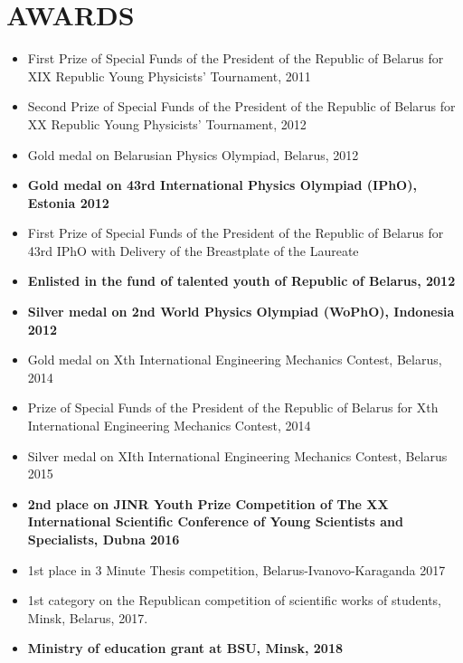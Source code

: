 \documentclass[paper=a4,fontsize=11pt]{scrartcl} %
\newcommand{\NewPart}[1]{\section*{\uppercase{#1}}}
\begin{document}
\NewPart{Awards}{}
\begin{itemize}
\item First Prize of Special Funds of the President of the Republic of Belarus for XIX Republic Young Physicists' Tournament, 2011
\item Second Prize of Special Funds of the President of the Republic of Belarus for XX Republic Young Physicists' Tournament, 2012
\item Gold medal on Belarusian Physics Olympiad, Belarus, 2012
\item \textbf{Gold medal on 43rd International Physics Olympiad (IPhO), Estonia 2012}
\item First Prize of Special Funds of the President of the Republic of Belarus for 43rd IPhO with Delivery of the Breastplate of the Laureate
\item \textbf{Enlisted in the fund of talented youth of Republic of Belarus, 2012}
\item \textbf{Silver medal on 2nd World Physics Olympiad (WoPhO), Indonesia 2012}
\item Gold medal on Xth International Engineering Mechanics Contest, Belarus, 2014
\item Prize of Special Funds of the President of the Republic of Belarus for Xth International Engineering Mechanics Contest, 2014
\item Silver medal on XIth International Engineering Mechanics Contest, Belarus 2015
\item \textbf{2nd place on JINR Youth Prize Competition of The XX International Scientific Conference of Young Scientists and Specialists, Dubna 2016}
\item 1st place in 3 Minute Thesis competition, Belarus-Ivanovo-Karaganda 2017
\item 1st category on the Republican competition of scientific works of students, Minsk, Belarus, 2017.
\item \textbf{Ministry of education grant at BSU, Minsk, 2018}
\end{itemize}
\end{document}
